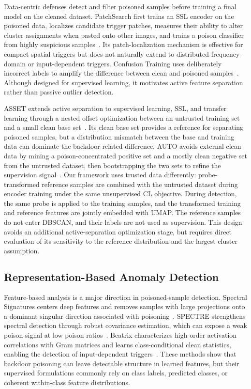 \documentclass[10pt,journal]{IEEEtran}
\begin{document}
Data-centric defenses detect and filter poisoned samples before training a final model on the cleaned dataset. PatchSearch first trains an SSL encoder on the poisoned data, localizes candidate trigger patches, measures their ability to alter cluster assignments when pasted onto other images, and trains a poison classifier from highly suspicious samples~\cite{Tejankar2023PatchSearch}. Its patch-localization mechanism is effective for compact spatial triggers but does not naturally extend to distributed frequency-domain or input-dependent triggers. Confusion Training uses deliberately incorrect labels to amplify the difference between clean and poisoned samples~\cite{Qi2023Proactive}. Although designed for supervised learning, it motivates active feature separation rather than passive outlier detection.

ASSET extends active separation to supervised learning, SSL, and transfer learning through a nested offset optimization between an untrusted training set and a small clean base set~\cite{Pan2023ASSET}. Its clean base set provides a reference for separating poisoned samples, but a distribution mismatch between the base and training data can dominate the backdoor-related difference. AUTO avoids external clean data by mining a poison-concentrated positive set and a mostly clean negative set from the untrusted dataset, then bootstrapping the two sets to refine the supervision signal~\cite{Chen2025AUTO}. Our framework uses trusted data differently: probe-transformed reference samples are combined with the untrusted dataset during encoder training under the same unsupervised CL objective. During detection, the same probe is applied to the training samples, and the transformed training and reference features are jointly embedded with UMAP. The reference samples do not enter DBSCAN, and their labels are not used as supervision. This design avoids an additional active-separation optimization stage, but requires direct evaluation of its sensitivity to the reference distribution and the largest-cluster assumption.

\subsection{Representation-Based Anomaly Detection}
Feature-based analysis is a major direction in poisoned-sample detection. Spectral Signatures centers deep features and removes samples with large projections onto a dominant singular direction associated with poisoning~\cite{Tran2018Spectral}. SPECTRE strengthens spectral detection through robust covariance estimation, which can expose a weak poison signal at low poison ratios~\cite{Hayase2021SPECTRE}. Beatrix characterizes high-order activation correlations with Gram matrices and learns class-conditional clean statistics, enabling the detection of input-dependent triggers~\cite{Ma2023Beatrix}. These methods show that backdoor poisoning can leave detectable structure in learned features, but their supervised formulations commonly rely on class labels, predicted classes, or coherent within-class feature distributions.
\end{document}
